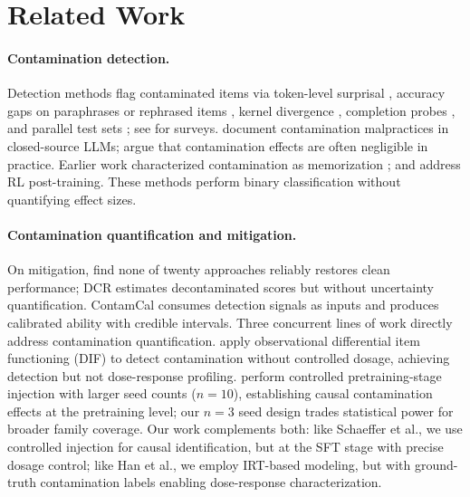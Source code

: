 \section{Related Work}\label{sec:related_work}

\paragraph{Contamination detection.}
Detection methods flag contaminated items via token-level surprisal \citep{shi_2023_minkprob,zhang_2024_minkpp}, accuracy gaps on paraphrases or rephrased items \citep{dekoninck2024constat,yang2023rethinking}, kernel divergence \citep{choi_2025_kds}, completion probes \citep{dong_2024_cdd,golchin2024time}, and parallel test sets \citep{zhang_2024_gsm1k}; see \citet{chen2025benchmarking,singh2024evaluation,sainz2023nlp} for surveys. \citet{balloccu2024leak} document contamination malpractices in closed-source LLMs; \citet{bordt2025forget} argue that contamination effects are often negligible in practice. Earlier work characterized contamination as memorization \citep{carlini2023quantifying,magar_2022_contamination,li_2024_task_contamination,xu_2024_leakage}; \citet{tao2025detecting} and \citet{kocyigit2025impact} address RL post-training. These methods perform binary classification without quantifying effect sizes.

\paragraph{Contamination quantification and mitigation.}
On mitigation, \citet{sun2025emperor} find none of twenty approaches reliably restores clean performance; DCR \citep{xu2025dcr} estimates decontaminated scores but without uncertainty quantification. ContamCal consumes detection signals as inputs and produces calibrated ability with credible intervals. Three concurrent lines of work directly address contamination quantification. \citet{han2026quantifying} apply observational differential item functioning (DIF) to detect contamination without controlled dosage, achieving detection but not dose-response profiling. \citet{schaeffer2026causally} perform controlled pretraining-stage injection with larger seed counts ($n\!=\!10$), establishing causal contamination effects at the pretraining level; our $n\!=\!3$ seed design trades statistical power for broader family coverage. Our work complements both: like Schaeffer et al., we use controlled injection for causal identification, but at the SFT stage with precise dosage control; like Han et al., we employ IRT-based modeling, but with ground-truth contamination labels enabling dose-response characterization.

